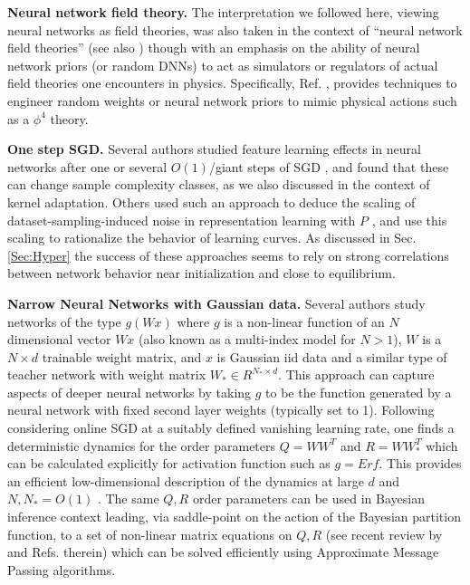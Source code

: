 {\bf Neural network field theory.} The interpretation we followed here, viewing neural networks as field theories, was also taken in the context of ``neural network field theories'' \citep{Halverson2021,Demirtas2023} (see also \cite{naveh2021predictingoutputsfinitedeepV1}) though with an emphasis on the ability of neural network priors (or random DNNs) to act as simulators or regulators of actual field theories one encounters in physics. Specifically, Ref. \cite{Demirtas2023}, provides techniques to engineer random weights or neural network priors to mimic physical actions such as a $\phi^4$ theory.

{\bf One step SGD.} Several authors studied feature learning effects in neural networks after one or several $O(1)$/giant steps of SGD \citep{ba2022highdimensional,damian2022neuralnetworkslearnrepresentations,dandi2023twolayerneuralnetworkslearn}, and found that these can change sample complexity classes, as we also discussed in the context of kernel adaptation. Others used such an approach to deduce the scaling of dataset-sampling-induced noise in representation learning with $P$ \citep{Paccolat_2021}, and use this scaling to rationalize the behavior of learning curves. As discussed in Sec. \ref{Sec:Hyper} the success of these approaches seems to rely on strong correlations between network behavior near initialization and close to equilibrium. 


{\bf Narrow Neural Networks with Gaussian data.} Several authors study networks of the type $g(Wx)$ where $g$ is a non-linear function of an $N$ dimensional vector $Wx$ (also known as a multi-index model for $N>1$), $W$ is a $N \times d$ trainable weight matrix, and $x$ is Gaussian iid data and a similar type of teacher network with weight matrix $W_* \in R^{N_* \times d}$. This approach can capture aspects of deeper neural networks by taking $g$ to be the function generated by a neural network with fixed second layer weights (typically set to 1). Following \citet{saad1995dynamics,biehl1994line, biehl1995learning, saad1995exact} considering online SGD at a suitably defined vanishing learning rate, one finds a deterministic dynamics for the order parameters $Q = W W^T$ and $R=W W_*^T$ which can be calculated explicitly for activation function such as $g=Erf$. This provides an efficient low-dimensional description of the dynamics at large $d$ and $N,N_*=O(1)$ \citep{saad1995dynamics, goldt2019dynamics,wang2019solvable, arnaboldi2023highdimensional,ben2022high,damian2023smoothing,Bruno,dandi2024benefits, collinswoodfin2023hitting}. The same $Q,R$ order parameters can be used in Bayesian inference context leading, via saddle-point on the action of the Bayesian partition function, to a set of non-linear matrix equations on $Q,R$ (see recent review by \citet{cui2024high} and Refs. therein) which can be solved efficiently using Approximate Message Passing algorithms. 


